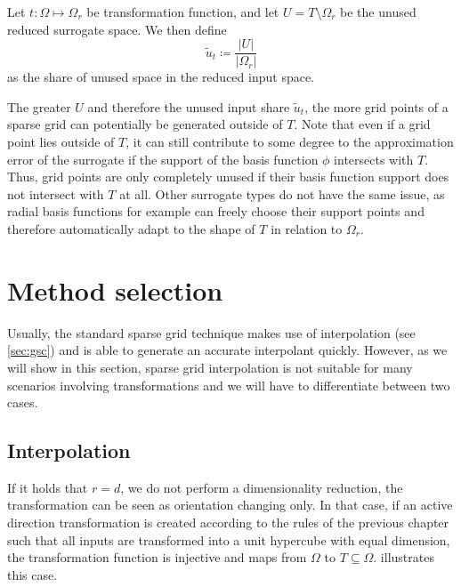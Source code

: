 \documentclass[
  a4paper,  %
  twoside,  %
  bibliography=totoc,
  headsepline,
  cleardoublepage=empty,
  parskip=half,
  draft=false
]{scrbook}
\begin{document}
\begin{definition}
Let $t \colon \Omega \mapsto \Omega_r$ be transformation function, and let $U=T \setminus \Omega_r$ be the unused reduced surrogate space.
We then define
\begin{equation}
\tilde{u}_t \coloneqq \frac{|U|}{|\Omega_r|}
\end{equation}
as the share of unused space in the reduced input space.
\end{definition}
%
The greater $U$ and therefore the unused input share $\tilde{u}_t$, the more grid points of a sparse grid can potentially be generated outside of $T$.
Note that even if a grid point lies outside of $T$, it can still contribute to some degree to the approximation error of the surrogate if the support of the basis function $\phi$ intersects with $T$.
Thus, grid points are only completely unused if their basis function support does not intersect with $T$ at all.
Other surrogate types do not have the same issue, as radial basis functions for example can freely choose their support points and therefore automatically adapt to the shape of $T$ in relation to $\Omega_r$.

\section{Method selection}
\label{sec:ms}

Usually, the standard sparse grid technique makes use of interpolation (see \cref{sec:gsc}) and is able to generate an accurate interpolant quickly.
However, as we will show in this section, sparse grid interpolation is not suitable for many scenarios involving transformations and we will have to differentiate between two cases.

\subsection{Interpolation}
If it holds that $r=d$, \ie we do not perform a dimensionality reduction, the transformation can be seen as orientation changing only.
In that case, if an active direction transformation is created according to the rules of the previous chapter such that all inputs are transformed into a unit hypercube with equal dimension, the transformation function is injective and maps from $\Omega$ to $T \subseteq \Omega$.
 illustrates this case.
\end{document}
